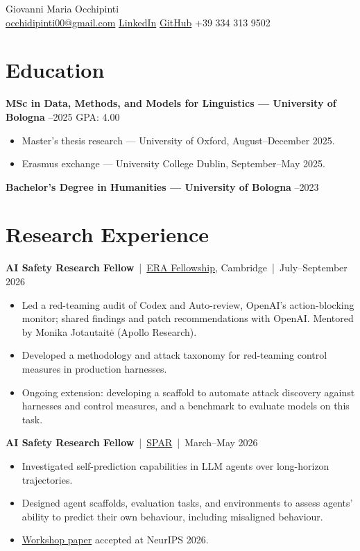 \documentclass[10pt,a4paper]{article}
\newcommand{\role}[3]{\par\addvspace{6pt}%
  \textbf{#1}~|~#2~|~#3\par}
\begin{document}
\begin{center}
  {\LARGE Giovanni Maria Occhipinti}\\[4pt]
  \href{mailto:occhidipinti00@gmail.com}{occhidipinti00@gmail.com}
  \enspace\textbar\enspace
  \href{https://www.linkedin.com/in/occhipintigiovanni/}{LinkedIn}
  \enspace\textbar\enspace
  \href{https://github.com/Joe-Occhipinti}{GitHub}
  \enspace\textbar\enspace
  +39 334 313 9502
\end{center}
\vspace{-6pt}

\section*{Education}
\textbf{MSc in Data, Methods, and Models for Linguistics --- University of Bologna} \enspace\textbar{}--2025 \enspace\textbar\enspace GPA: 4.00
\begin{itemize}
  \item Master's thesis research --- University of Oxford, August--December 2025.
  \item Erasmus exchange --- University College Dublin, September--May 2025.
\end{itemize}
\vspace{3pt}
\textbf{Bachelor's Degree in Humanities --- University of Bologna} \enspace\textbar{}--2023

\section*{Research Experience}

\role{AI Safety Research Fellow}{\href{https://erafellowship.org/}{ERA Fellowship}, Cambridge}{July--September 2026}
\begin{itemize}
  \item Led a red-teaming audit of Codex and Auto-review, OpenAI's action-blocking monitor; shared findings and patch recommendations with OpenAI. Mentored by Monika Jotautait\.{e} (Apollo Research).
  \item Developed a methodology and attack taxonomy for red-teaming control measures in production harnesses.
  \item Ongoing extension: developing a scaffold to automate attack discovery against harnesses and control measures, and a benchmark to evaluate models on this task.
\end{itemize}

\role{AI Safety Research Fellow}{\href{https://sparai.org/}{SPAR}}{March--May 2026}
\begin{itemize}
  \item Investigated self-prediction capabilities in LLM agents over long-horizon trajectories.
  \item Designed agent scaffolds, evaluation tasks, and environments to assess agents' ability to predict their own behaviour, including misaligned behaviour.
  \item \href{https://openreview.net/forum?id=g3O9cQQX1G}{Workshop paper} accepted at NeurIPS 2026.
\end{itemize}
\end{document}
